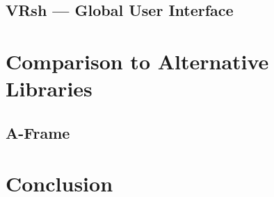 \documentclass[conference,12pt]{IEEEtran}
\newcommand\name{VRsh}
\begin{document}
\subsection{{\name} --- Global User Interface}

\section{Comparison to Alternative Libraries}

\subsection{A-Frame}

\section{Conclusion}

{\printbibliography}
\end{document}
